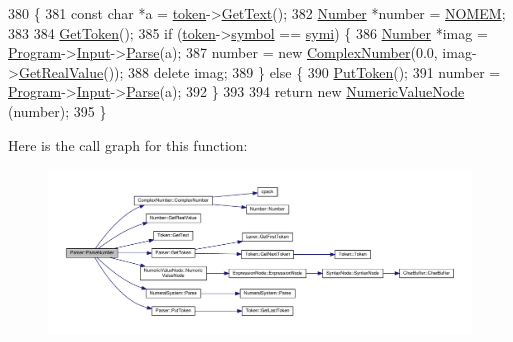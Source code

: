 \begin{DoxyCode}
380 \{
381     \textcolor{keyword}{const} \textcolor{keywordtype}{char} *a = \hyperlink{classParser_a467028559d31c5b33f16ca8be56715cc}{token}->\hyperlink{structToken_a15f1043de07ce8e452fbf115b85def71}{GetText}();
382     \hyperlink{structNumber}{Number} *number = \hyperlink{platform_8h_a46ff2bfbf0d44b8466a2251d5bd5e6f8}{NOMEM};
383 
384     \hyperlink{classParser_a415a103e66558b4d366d9a1420561fe3}{GetToken}();
385     \textcolor{keywordflow}{if} (\hyperlink{classParser_a467028559d31c5b33f16ca8be56715cc}{token}->\hyperlink{structToken_aa671eaaae5632c5277e89a090d864820}{symbol} == \hyperlink{lex_8h_a7feef761cd73fac6e25b8bb80d2c4e54ad05a0339b057b1842d956222973cbd98}{symi}) \{
386         \hyperlink{structNumber}{Number} *imag = \hyperlink{classProgram}{Program}->\hyperlink{classProgram_a6327f15962926e4f74f15e8ff56e04e5}{Input}->\hyperlink{classNumeralSystem_af3643941efdda71a873e2a31276f2d49}{Parse}(a);
387         number = \textcolor{keyword}{new} \hyperlink{structComplexNumber}{ComplexNumber}(0.0, imag->\hyperlink{structNumber_a83da654d465f1344162ce8b8f8c564b9}{GetRealValue}());
388         \textcolor{keyword}{delete} imag;
389     \} \textcolor{keywordflow}{else} \{
390         \hyperlink{classParser_adb5c3a188b36f7ecb198ae30f06338b3}{PutToken}();
391         number = \hyperlink{classProgram}{Program}->\hyperlink{classProgram_a6327f15962926e4f74f15e8ff56e04e5}{Input}->\hyperlink{classNumeralSystem_af3643941efdda71a873e2a31276f2d49}{Parse}(a);
392     \}
393 
394     \textcolor{keywordflow}{return} \textcolor{keyword}{new} \hyperlink{classNumericValueNode}{NumericValueNode} (number);
395 \}
\end{DoxyCode}


Here is the call graph for this function\+:\nopagebreak
\begin{figure}[H]
\begin{center}
\leavevmode
\includegraphics[width=350pt]{classParser_a769d580b14d3d097ed255ad869cc1653_cgraph}
\end{center}
\end{figure}




